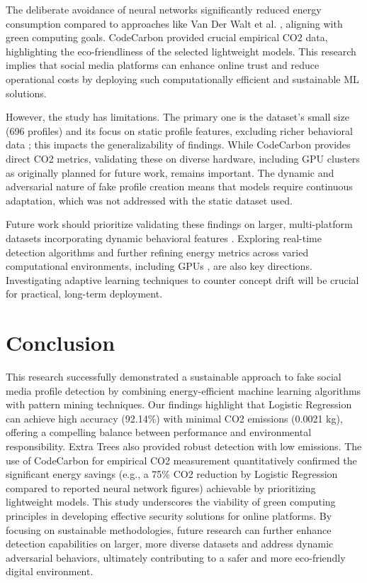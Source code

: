 \documentclass[conference]{IEEEtran}
\begin{document}
The deliberate avoidance of neural networks significantly reduced energy consumption compared to approaches like Van Der Walt et al. \cite{b6}, aligning with green computing goals. CodeCarbon provided crucial empirical CO2 data, highlighting the eco-friendliness of the selected lightweight models. This research implies that social media platforms can enhance online trust and reduce operational costs by deploying such computationally efficient and sustainable ML solutions.

However, the study has limitations. The primary one is the dataset's small size (696 profiles) and its focus on static profile features, excluding richer behavioral data \cite{b12}; this impacts the generalizability of findings. While CodeCarbon provides direct CO2 metrics, validating these on diverse hardware, including GPU clusters as originally planned for future work, remains important. The dynamic and adversarial nature of fake profile creation means that models require continuous adaptation, which was not addressed with the static dataset used.

Future work should prioritize validating these findings on larger, multi-platform datasets incorporating dynamic behavioral features \cite{b12}. Exploring real-time detection algorithms \cite{b14} and further refining energy metrics across varied computational environments, including GPUs \cite{b13}, are also key directions. Investigating adaptive learning techniques to counter concept drift will be crucial for practical, long-term deployment.

\section{Conclusion}
\label{sec:conclude}
This research successfully demonstrated a sustainable approach to fake social media profile detection by combining energy-efficient machine learning algorithms with pattern mining techniques. Our findings highlight that Logistic Regression can achieve high accuracy (92.14\%) with minimal CO2 emissions (0.0021 kg), offering a compelling balance between performance and environmental responsibility. Extra Trees also provided robust detection with low emissions. The use of CodeCarbon for empirical CO2 measurement quantitatively confirmed the significant energy savings (e.g., a 75\% CO2 reduction by Logistic Regression compared to reported neural network figures) achievable by prioritizing lightweight models. This study underscores the viability of green computing principles in developing effective security solutions for online platforms. By focusing on sustainable methodologies, future research can further enhance detection capabilities on larger, more diverse datasets and address dynamic adversarial behaviors, ultimately contributing to a safer and more eco-friendly digital environment.
\end{document}
